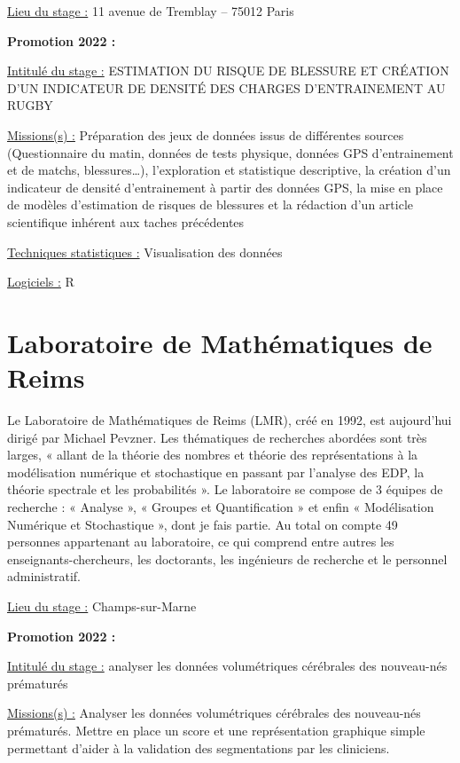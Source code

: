 \documentclass[
  letterpaper,
  DIV=11,
  numbers=noendperiod]{scrreprt}
\begin{document}
\uline{Lieu du stage :} 11 avenue de Tremblay -- 75012 Paris

\textbf{Promotion 2022 :}

\uline{Intitulé du stage :} ESTIMATION DU RISQUE DE BLESSURE ET CRÉATION
D'UN INDICATEUR DE DENSITÉ DES CHARGES D'ENTRAINEMENT AU RUGBY

\uline{Missions(s) :} Préparation des jeux de données issus de
différentes sources (Questionnaire du matin, données de tests physique,
données GPS d'entrainement et de matchs, blessures\ldots), l'exploration
et statistique descriptive, la création d'un indicateur de densité
d'entrainement à partir des données GPS, la mise en place de modèles
d'estimation de risques de blessures et la rédaction d'un article
scientifique inhérent aux taches précédentes

\uline{Techniques statistiques :} Visualisation des données

\uline{Logiciels :} R

\hypertarget{laboratoire-de-mathuxe9matiques-de-reims}{%
\section{\texorpdfstring{\textbf{Laboratoire de Mathématiques de
Reims}}{Laboratoire de Mathématiques de Reims}}\label{laboratoire-de-mathuxe9matiques-de-reims}}

Le Laboratoire de Mathématiques de Reims (LMR), créé en 1992, est
aujourd'hui dirigé par Michael Pevzner. Les thématiques de recherches
abordées sont très larges, « allant de la théorie des nombres et théorie
des représentations à la modélisation numérique et stochastique en
passant par l'analyse des EDP, la théorie spectrale et les probabilités
». Le laboratoire se compose de 3 équipes de recherche : « Analyse », «
Groupes et Quantification » et enfin « Modélisation Numérique et
Stochastique », dont je fais partie. Au total on compte 49 personnes
appartenant au laboratoire, ce qui comprend entre autres les
enseignants-chercheurs, les doctorants, les ingénieurs de recherche et
le personnel administratif.

\uline{Lieu du stage :} Champs-sur-Marne

\textbf{Promotion 2022 :}

\uline{Intitulé du stage :} analyser les données volumétriques
cérébrales des nouveau-nés prématurés

\uline{Missions(s) :} Analyser les données volumétriques cérébrales des
nouveau-nés prématurés. Mettre en place un score et une représentation
graphique simple permettant d'aider à la validation des segmentations
par les cliniciens.
\end{document}
